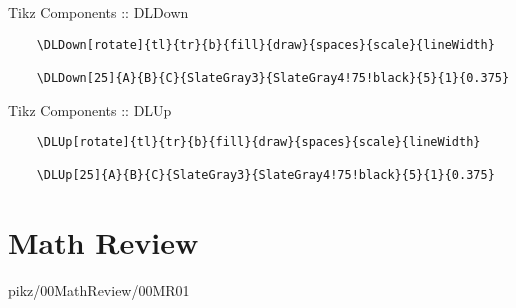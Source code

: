 \documentclass[9pt,xcolor={svgnames, x11names}]{beamer}
\begin{document}
\begin{frame}[fragile]{Tikz Components :: DLDown}

  \footnotesize
  \begin{verbatim}
    \DLDown[rotate]{tl}{tr}{b}{fill}{draw}{spaces}{scale}{lineWidth}

    \DLDown[25]{A}{B}{C}{SlateGray3}{SlateGray4!75!black}{5}{1}{0.375}
  \end{verbatim}


\end{frame}

\begin{frame}[fragile]{Tikz Components :: DLUp}

  \footnotesize
  \begin{verbatim}
    \DLUp[rotate]{tl}{tr}{b}{fill}{draw}{spaces}{scale}{lineWidth}

    \DLUp[25]{A}{B}{C}{SlateGray3}{SlateGray4!75!black}{5}{1}{0.375}
  \end{verbatim}


\end{frame}




\section{Math Review}


\begin{frame}{pikz/00MathReview/00MR01}
  \resizebox{0.75\textwidth}{!}{%
    
  }
\end{frame}
\end{document}
